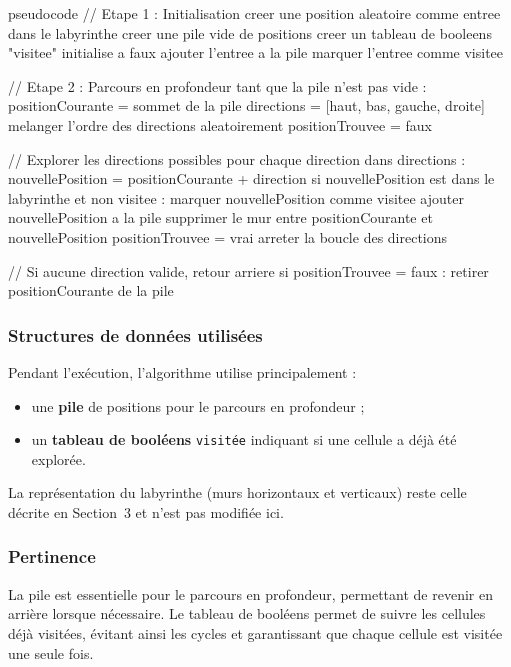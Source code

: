 \documentclass{butexFR}
\begin{document}
\begin{codeboxlang}{pseudocode}
// Etape 1 : Initialisation
creer une position aleatoire comme entree dans le labyrinthe
creer une pile vide de positions
creer un tableau de booleens "visitee" initialise a faux
ajouter l'entree a la pile
marquer l'entree comme visitee

// Etape 2 : Parcours en profondeur
tant que la pile n'est pas vide :
    positionCourante = sommet de la pile
    directions = [haut, bas, gauche, droite]
    melanger l'ordre des directions aleatoirement
    positionTrouvee = faux

    // Explorer les directions possibles
    pour chaque direction dans directions :
        nouvellePosition = positionCourante + direction
        si nouvellePosition est dans le labyrinthe et non visitee :
            marquer nouvellePosition comme visitee
            ajouter nouvellePosition a la pile
            supprimer le mur entre positionCourante et nouvellePosition
            positionTrouvee = vrai
            arreter la boucle des directions

    // Si aucune direction valide, retour arriere
    si positionTrouvee = faux :
        retirer positionCourante de la pile
\end{codeboxlang}

\subsubsection{Structures de données utilisées}

Pendant l'exécution, l'algorithme utilise principalement :

\begin{itemize}
    \item une \textbf{pile} de positions pour le parcours en profondeur ;
    \item un \textbf{tableau de booléens} \texttt{visitée} indiquant si une cellule a déjà été explorée.
\end{itemize}

La représentation du labyrinthe (murs horizontaux et verticaux) reste celle décrite en Section~3 et n'est pas modifiée ici.


\subsubsection{Pertinence}

La pile est essentielle pour le parcours en profondeur, permettant de revenir en arrière lorsque nécessaire. Le tableau de booléens permet de suivre les cellules déjà visitées, évitant ainsi les cycles et garantissant que chaque cellule est visitée une seule fois.
\end{document}
